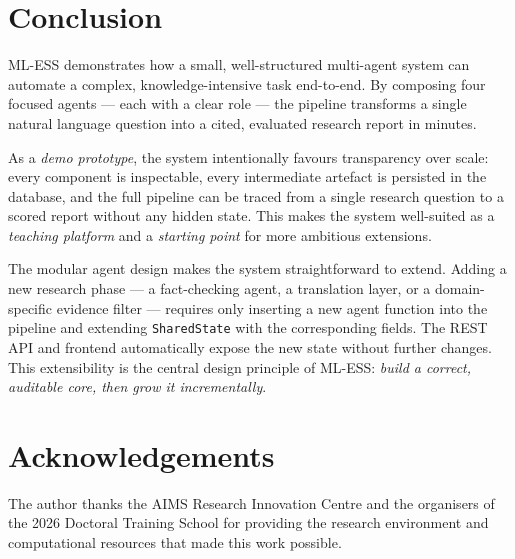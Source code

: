 \documentclass[10pt, twocolumn]{article}
\begin{document}
\section{Conclusion}

ML-ESS demonstrates how a small, well-structured multi-agent system can
automate a complex, knowledge-intensive task end-to-end. By composing four
focused agents — each with a clear role — the pipeline transforms a single
natural language question into a cited, evaluated research report in minutes.

As a \emph{demo prototype}, the system intentionally favours transparency over
scale: every component is inspectable, every intermediate artefact is persisted
in the database, and the full pipeline can be traced from a single research
question to a scored report without any hidden state. This makes the system
well-suited as a \emph{teaching platform} and a \emph{starting point} for
more ambitious extensions.

The modular agent design makes the system straightforward to extend. Adding a
new research phase — a fact-checking agent, a translation layer, or a
domain-specific evidence filter — requires only inserting a new agent function
into the pipeline and extending \texttt{SharedState} with the corresponding
fields. The REST API and frontend automatically expose the new state without
further changes. This extensibility is the central design principle of ML-ESS:
\emph{build a correct, auditable core, then grow it incrementally}.


\section*{Acknowledgements}

The author thanks the AIMS Research Innovation Centre and the organisers of the
2026 Doctoral Training School for providing the research environment and
computational resources that made this work possible.

\end{document}
